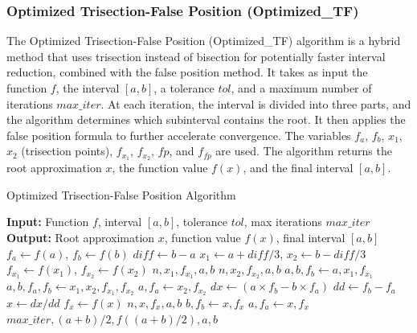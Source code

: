 \documentclass[reprint, amsmath, amssymb, aps, prl]{revtex4-2}
\begin{document}
\subsubsection{Optimized Trisection-False Position (Optimized\_TF)}

The Optimized Trisection-False Position (Optimized\_TF) algorithm is a hybrid method that uses trisection instead of bisection for potentially faster interval reduction, combined with the false position method. It takes as input the function $f$, the interval $[a, b]$, a tolerance $tol$, and a maximum number of iterations $max\_iter$. At each iteration, the interval is divided into three parts, and the algorithm determines which subinterval contains the root. It then applies the false position formula to further accelerate convergence. The variables $f_a$, $f_b$, $x_1$, $x_2$ (trisection points), $f_{x_1}$, $f_{x_2}$, $fp$, and $f_{fp}$ are used. The algorithm returns the root approximation $x$, the function value $f(x)$, and the final interval $[a, b]$.

\vspace{1em}
\begin{algorithm}[h!]
\caption{Optimized Trisection-False Position Algorithm}
\begin{algorithmic}[1]
\State \textbf{Input:} Function $f$, interval $[a, b]$, tolerance $tol$, max iterations $max\_iter$
\State \textbf{Output:} Root approximation $x$, function value $f(x)$, final interval $[a, b]$
\State $f_a \gets f(a)$, $f_b \gets f(b)$
    \State $diff \gets b - a$
    \State $x_1 \gets a + diff/3$, $x_2 \gets b - diff/3$
    \State $f_{x_1} \gets f(x_1)$, $f_{x_2} \gets f(x_2)$
        \State \Return $n, x_1, f_{x_1}, a, b$
    \EndIf
        \State \Return $n, x_2, f_{x_2}, a, b$
    \EndIf
        \State $a, b, f_b \gets a, x_1, f_{x_1}$
        \State $a, b, f_a, f_b \gets x_1, x_2, f_{x_1}, f_{x_2}$
    \Else
        \State $a, f_a \gets x_2, f_{x_2}$
    \EndIf
    \State $dx \gets (a \times f_b - b \times f_a)$
    \State $dd \gets f_b - f_a$
    \State $x \gets dx / dd$
    \State $f_x \gets f(x)$
        \State \Return $n, x, f_x, a, b$
    \EndIf
        \State $b, f_b \gets x, f_x$
    \Else
        \State $a, f_a \gets x, f_x$
    \EndIf
\EndFor
\State \Return $max\_iter, (a + b)/2, f((a + b)/2), a, b$
\end{algorithmic}
\end{algorithm}
\vspace{1em}
\end{document}

